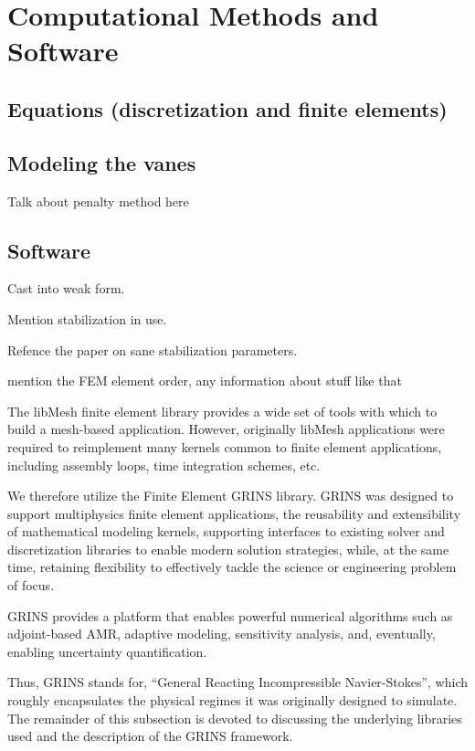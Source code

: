 \section{Computational Methods and Software}
\label{sec:software}

\subsection{Equations (discretization and finite elements)}

\subsection{Modeling the vanes}

Talk about penalty method here

\subsection{Software}

Cast into weak form. 

Mention stabilization in use. 

Refence the paper on sane stabilization parameters. 

mention the FEM element order, any information about stuff like that

The libMesh\cite{libmesh} finite element library
provides a wide set of tools with which to build a mesh-based
application. However, originally libMesh applications were required to
reimplement many kernels common to finite element applications,
including assembly loops, time integration schemes, etc. 

We therefore utilize the Finite Element GRINS library\cite{grins}.
GRINS was designed to support multiphysics finite element
applications, the reusability and extensibility of mathematical
modeling kernels, supporting interfaces to existing solver and
discretization libraries to enable modern solution strategies, while, at
the same time, retaining flexibility to effectively tackle the science
or engineering problem of focus. 

GRINS provides a platform that enables powerful numerical algorithms
such as adjoint-based AMR, adaptive modeling, sensitivity analysis,
and, eventually, enabling uncertainty quantification.

Thus, GRINS stands for, ``General Reacting Incompressible Navier-Stokes'',
which roughly encapsulates the physical regimes it was originally
designed to simulate. 
The remainder of this subsection is devoted to discussing the underlying
libraries used and the description of the GRINS framework. 

